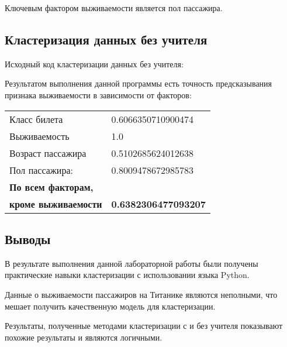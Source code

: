 Ключевым фактором выживаемости является пол пассажира.

\subsection*{Кластеризация данных без учителя}
Исходный код кластеризации данных без учителя:  
 

Результатом выполнения данной программы есть точность предсказывания признака выживаемости в зависимости от факторов:

\begin{table}[H]
  \begin{tabular}{l|l}
    Класс билета & 0.6066350710900474 \\
	Выживаемость & 1.0 \\
	Возраст пассажира & 0.5102685624012638 \\
	Пол пассажира: & 0.8009478672985783 \\\hline
	\textbf{По всем факторам,} \\ \textbf{кроме выживаемости} & \textbf{0.6382306477093207} \\
  \end{tabular}
  \label{tab:main_2_results}
\end{table}

\subsection*{Выводы}
В результате выполнения данной лабораторной работы были получены практические навыки кластеризации с использовании языка Python.

Данные о выживаемости пассажиров на Титанике являются неполными, что мешает получить качественную модель для кластеризации.

Результаты, полученные методами кластеризации с и без учителя показывают похожие результаты и являются логичными.


